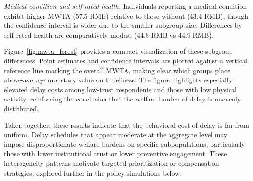 \textit{Medical condition and self-rated health.} Individuals reporting a medical condition exhibit higher MWTA (57.5 RMB) relative to those without (43.4 RMB), though the confidence interval is wider due to the smaller subgroup size. Differences by self-rated health are comparatively modest (44.8 RMB vs 44.9 RMB). 

Figure~\ref{fig:mwta_forest} provides a compact visualization of these subgroup differences. Point estimates and confidence intervals are plotted against a vertical reference line marking the overall MWTA, making clear which groups place above-average monetary value on timeliness. The figure highlights especially elevated delay costs among low-trust respondents and those with low physical activity, reinforcing the conclusion that the welfare burden of delay is unevenly distributed. 

Taken together, these results indicate that the behavioral cost of delay is far from uniform. Delay schedules that appear moderate at the aggregate level may impose disproportionate welfare burdens on specific subpopulations, particularly those with lower institutional trust or lower preventive engagement. These heterogeneity patterns motivate targeted prioritization or compensation strategies, explored further in the policy simulations below.
